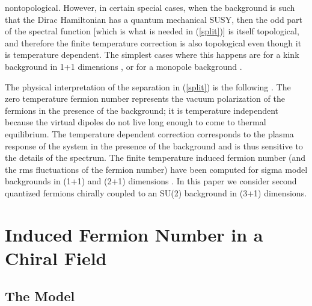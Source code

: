 \documentclass[a4paper,prd,showpacs,showkeys]{revtex4}
\begin{document}
nontopological. However, in certain special cases, when the background is such that the Dirac Hamiltonian has a quantum mechanical SUSY, then the odd part of the spectral function \coordHE{} [which is what is needed in (\ref{split})] is itself topological, and therefore the finite temperature correction is also topological even though it is temperature dependent. The simplest cases where this happens are for a kink background in 1+1 dimensions \cite{semenoff,dunneian}, or for a monopole background \cite{cp,feinberg}.

The physical interpretation of the separation in (\ref{split}) is the following \cite{dunneian}. The zero temperature fermion number  \coordHE{} represents the vacuum polarization of the fermions in the presence of the background; it is temperature independent because the virtual dipoles do not live long enough to come to thermal equilibrium. The temperature dependent correction corresponds to the plasma response of the system in the presence of the background and is thus sensitive to the details of the spectrum. The finite temperature induced fermion number (and the rms fluctuations of the fermion number) have been computed for sigma model backgrounds in (1+1) and (2+1) dimensions \cite{dunneian,dunne,fluc,nonlinearsigma}. In this paper we consider second quantized fermions chirally coupled to an SU(2)  background in (3+1) dimensions.

\section{Induced Fermion Number in a Chiral Field}

\subsection{The Model}
\end{document}
